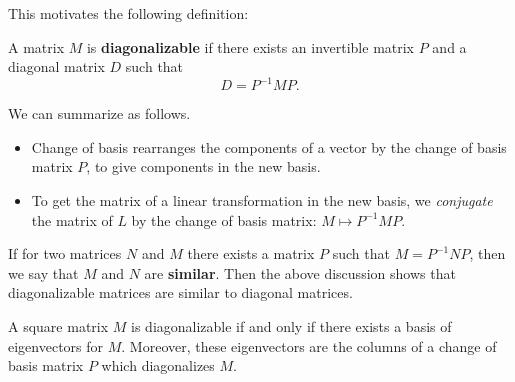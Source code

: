 This motivates the following definition:
\begin{definition}
A matrix $M$ is {\bfseries diagonalizable} if there exists an invertible matrix $P$ and a diagonal matrix $D$ such that 
\[
D=P^{-1}MP.
\]
\end{definition}

We can summarize as follows.
\begin{itemize}
\item Change of basis rearranges the components of a vector by the change of basis matrix $P$, to give components in the new basis.
\item To get the matrix of a linear transformation in the new basis, we \emph{conjugate} the matrix of $L$ by the change of basis matrix: $M\mapsto P^{-1}MP$.
\end{itemize}

If for two matrices $N$ and $M$ there exists a matrix $P$ such that $M=P^{-1}NP$, then we say that $M$ and $N$ are {\bfseries similar}.  Then the above discussion shows that diagonalizable matrices are similar to diagonal matrices.

\begin{corollary}
A square matrix $M$ is diagonalizable if and only if there exists a basis of eigenvectors for $M$. Moreover, these eigenvectors are the columns of a change of basis matrix \(P\) which diagonalizes \(M\).
\end{corollary}


